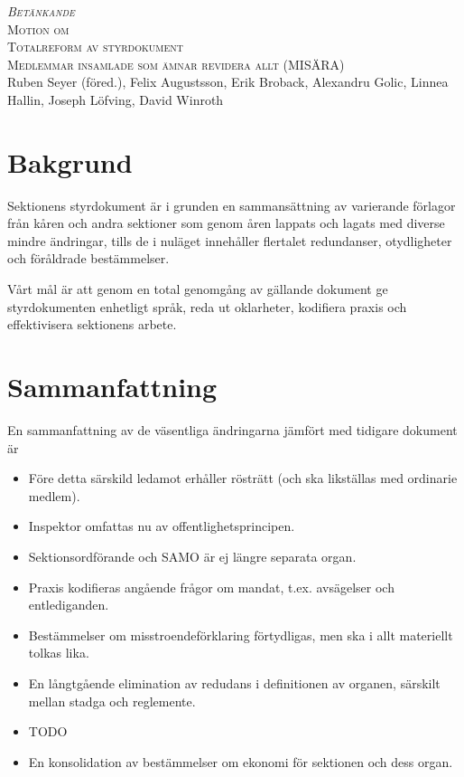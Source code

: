 \documentclass{article}
\newcommand{\motionsnamn}{Totalreform av styrdokument}
\newcommand{\motionar}{Medlemmar insamlade som ämnar revidera allt (MISÄRA)}
\begin{document}
\begin{center}
\textsc{\huge\itshape Betänkande}\\[0.5cm]
\textsc{\Huge Motion om}\\[0.5cm]
\textsc{\huge \motionsnamn}\\[0.5cm]
\textsc{\large \motionar\\}
Ruben Seyer (föred.),
Felix Augustsson,
Erik Broback,
Alexandru Golic,
Linnea Hallin,
Joseph Löfving,
David Winroth
\end{center}

\section*{Bakgrund}
Sektionens styrdokument är i grunden en sammansättning av varierande förlagor från kåren och andra sektioner som genom åren lappats och lagats med diverse mindre ändringar, tills de i nuläget innehåller flertalet redundanser, otydligheter och föråldrade bestämmelser.

Vårt mål är att genom en total genomgång av gällande dokument ge styrdokumenten enhetligt språk, reda ut oklarheter, kodifiera praxis och effektivisera sektionens arbete.

\section*{Sammanfattning}
En sammanfattning av de väsentliga ändringarna jämfört med tidigare dokument är
\begin{itemize}
    \item Före detta särskild ledamot erhåller rösträtt (och ska likställas med ordinarie medlem).
    \item Inspektor omfattas nu av offentlighetsprincipen.
    \item Sektionsordförande och SAMO är ej längre separata organ.
    \item Praxis kodifieras angående frågor om mandat, t.ex. avsägelser och entlediganden.
    \item Bestämmelser om misstroendeförklaring förtydligas, men ska i allt materiellt tolkas lika.
    \item En långtgående elimination av redudans i definitionen av organen, särskilt mellan stadga och reglemente.
    \item TODO
    \item En konsolidation av bestämmelser om ekonomi för sektionen och dess organ.
\end{itemize}    
\end{document}
